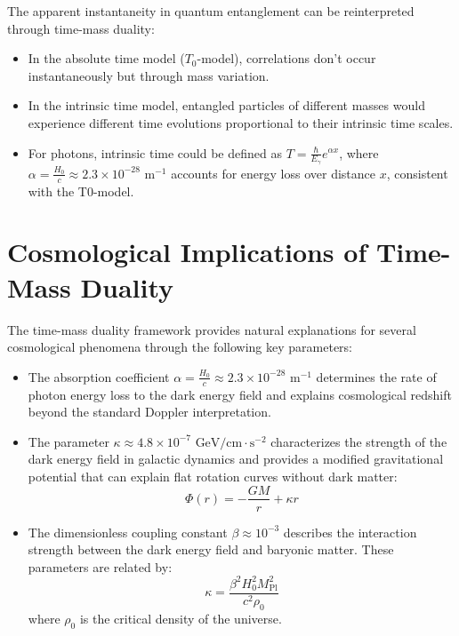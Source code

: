 \documentclass{article}
\begin{document}
	The apparent instantaneity in quantum entanglement can be reinterpreted through time-mass duality:
	
	\begin{itemize}
		\item In the absolute time model ($T_0$-model), correlations don't occur instantaneously but through mass variation.
		\item In the intrinsic time model, entangled particles of different masses would experience different time evolutions proportional to their intrinsic time scales.
		\item For photons, intrinsic time could be defined as $T = \frac{\hbar}{E_{\gamma}} e^{\alpha x}$, where $\alpha = \frac{H_0}{c} \approx 2.3 \times 10^{-28} \text{ m}^{-1}$ accounts for energy loss over distance $x$, consistent with the T0-model.
	\end{itemize}
	
	\section{Cosmological Implications of Time-Mass Duality}
	
	The time-mass duality framework provides natural explanations for several cosmological phenomena through the following key parameters:
	
	\begin{itemize}
		\item The absorption coefficient $\alpha = \frac{H_0}{c} \approx 2.3 \times 10^{-28} \text{ m}^{-1}$ determines the rate of photon energy loss to the dark energy field and explains cosmological redshift beyond the standard Doppler interpretation.
		
		\item The parameter $\kappa \approx 4.8 \times 10^{-7} \text{ GeV/cm}\cdot\text{s}^{-2}$ characterizes the strength of the dark energy field in galactic dynamics and provides a modified gravitational potential that can explain flat rotation curves without dark matter:
		\[
		\Phi(r) = -\frac{GM}{r} + \kappa r
		\]
		
		\item The dimensionless coupling constant $\beta \approx 10^{-3}$ describes the interaction strength between the dark energy field and baryonic matter. These parameters are related by:
		\[
		\kappa = \frac{\beta^2 H_0^2 M_{\text{Pl}}^2}{c^2 \rho_0}
		\]
		where $\rho_0$ is the critical density of the universe.
	\end{itemize}
	
\end{document}
